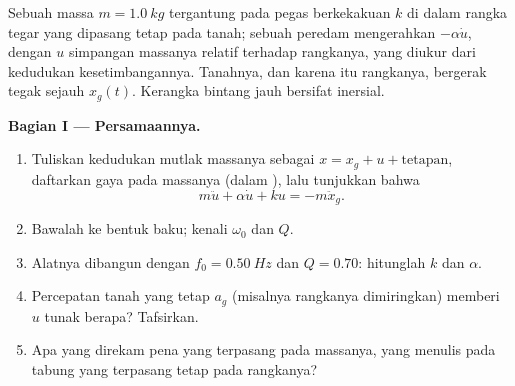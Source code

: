\begin{problem}
\label{pb:b1:oscillators-resonance:1}
Sebuah massa $m = \qty{1.0}{kg}$ tergantung pada pegas berkekakuan $k$
di dalam rangka tegar yang dipasang tetap pada tanah; sebuah peredam
mengerahkan $-\alpha\dot u$, dengan $u$ simpangan massanya relatif
terhadap rangkanya, yang diukur dari kedudukan kesetimbangannya.
Tanahnya, dan karena itu rangkanya, bergerak tegak sejauh $x_g(t)$.
Kerangka bintang jauh bersifat inersial.

\medskip
\noindent\textbf{Bagian I --- Persamaannya.}
\begin{enumerate}
  \item Tuliskan kedudukan mutlak massanya sebagai $x = x_g + u +
        \text{tetapan}$, daftarkan gaya pada massanya (dalam ), lalu tunjukkan bahwa
        \[
        m\ddot u + \alpha\dot u + ku = -m\ddot x_g .
        \]
  \item Bawalah ke bentuk baku; kenali $\omega_0$ dan $Q$.
  \item Alatnya dibangun dengan $f_0 = \qty{0.50}{Hz}$ dan $Q = 0.70$:
        hitunglah $k$ dan $\alpha$.
  \item Percepatan tanah yang tetap $a_g$ (misalnya rangkanya
        dimiringkan) memberi $u$ tunak berapa? Tafsirkan.
  \item Apa yang direkam pena yang terpasang pada massanya, yang menulis
        pada tabung yang terpasang tetap pada rangkanya?
\end{enumerate}


\end{problem}
